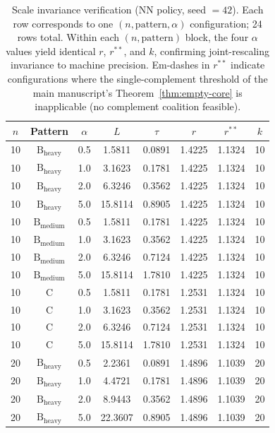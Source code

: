 \documentclass[11pt]{article}
\theoremstyle{plain}
\theoremstyle{definition}
\theoremstyle{remark}
\begin{document}
\begin{table}[htbp]
\centering
\footnotesize
\caption{Scale invariance verification (NN policy, seed $=42$). Each row corresponds to one $(n,\text{pattern},\alpha)$ configuration; 24 rows total. Within each $(n,\text{pattern})$ block, the four $\alpha$ values yield identical $r$, $r^{\ast\ast}$, and $k$, confirming joint-rescaling invariance to machine precision. Em-dashes in $r^{\ast\ast}$ indicate configurations where the single-complement threshold of the main manuscript's Theorem~\ref{thm:empty-core} is inapplicable (no complement coalition feasible).}
\label{tab:scale-invariance}
\begin{tabular}{@{}cccccccc@{}}
\toprule
$n$ & Pattern & $\alpha$ & $L$ & $\tau$ & $r$ & $r^{\ast\ast}$ & $k$ \\
\midrule
10 & $\text{B}_{\text{heavy}}$ & 0.5 & 1.5811 & 0.0891 & 1.4225 & 1.1324 & 10 \\
10 & $\text{B}_{\text{heavy}}$ & 1.0 & 3.1623 & 0.1781 & 1.4225 & 1.1324 & 10 \\
10 & $\text{B}_{\text{heavy}}$ & 2.0 & 6.3246 & 0.3562 & 1.4225 & 1.1324 & 10 \\
10 & $\text{B}_{\text{heavy}}$ & 5.0 & 15.8114 & 0.8905 & 1.4225 & 1.1324 & 10 \\
\midrule
10 & $\text{B}_{\text{medium}}$ & 0.5 & 1.5811 & 0.1781 & 1.4225 & 1.1324 & 10 \\
10 & $\text{B}_{\text{medium}}$ & 1.0 & 3.1623 & 0.3562 & 1.4225 & 1.1324 & 10 \\
10 & $\text{B}_{\text{medium}}$ & 2.0 & 6.3246 & 0.7124 & 1.4225 & 1.1324 & 10 \\
10 & $\text{B}_{\text{medium}}$ & 5.0 & 15.8114 & 1.7810 & 1.4225 & 1.1324 & 10 \\
\midrule
10 & C & 0.5 & 1.5811 & 0.1781 & 1.2531 & 1.1324 & 10 \\
10 & C & 1.0 & 3.1623 & 0.3562 & 1.2531 & 1.1324 & 10 \\
10 & C & 2.0 & 6.3246 & 0.7124 & 1.2531 & 1.1324 & 10 \\
10 & C & 5.0 & 15.8114 & 1.7810 & 1.2531 & 1.1324 & 10 \\
\midrule
20 & $\text{B}_{\text{heavy}}$ & 0.5 & 2.2361 & 0.0891 & 1.4896 & 1.1039 & 20 \\
20 & $\text{B}_{\text{heavy}}$ & 1.0 & 4.4721 & 0.1781 & 1.4896 & 1.1039 & 20 \\
20 & $\text{B}_{\text{heavy}}$ & 2.0 & 8.9443 & 0.3562 & 1.4896 & 1.1039 & 20 \\
20 & $\text{B}_{\text{heavy}}$ & 5.0 & 22.3607 & 0.8905 & 1.4896 & 1.1039 & 20 \\

\end{tabular}
\end{table}
\end{document}
